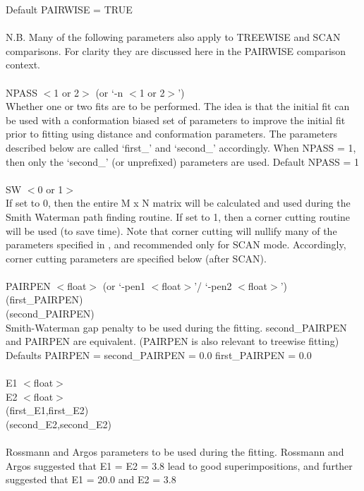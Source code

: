     Default PAIRWISE = TRUE\\
    \\
    N.B. Many of the following parameters also apply to TREEWISE and
    SCAN comparisons.  For clarity they are discussed here in the
    PAIRWISE comparison context.\\
    \\
    NPASS $<$1 or 2$>$ (or `-n  $<$1 or 2$>$')\\
    Whether one or two fits are to be performed.  The idea is that the 
    initial fit can be used with a conformation biased set of
    parameters to improve the initial fit prior to fitting using
    distance and conformation parameters.  The parameters described
    below are called `first\_' and `second\_' accordingly.  When NPASS =
    1, then only the `second\_' (or unprefixed) parameters are used.
    Default NPASS = 1\\
    \\
    SW $<$0 or 1$>$ \\
    If set to 0, then the entire M x N matrix will be calculated and
    used during the Smith Waterman path finding routine.  If set to 1,
    then a corner cutting routine will be used (to save time).  Note
    that corner cutting will nullify many of the parameters specified
    in \cite{rb92b}, and recommended only for SCAN mode. 
    Accordingly, corner cutting parameters are specified below (after
    SCAN).\\
    \\
    PAIRPEN $<$float$>$ (or `-pen1 $<$float$>$'/ `-pen2 $<$float$>$')\\
    (first\_PAIRPEN)\\
    (second\_PAIRPEN)\\
    Smith-Waterman gap penalty to be used during the fitting. 
    second\_PAIRPEN and PAIRPEN are equivalent. (PAIRPEN is also
    relevant to treewise fitting)\\
    Defaults PAIRPEN = second\_PAIRPEN = 0.0  first\_PAIRPEN = 0.0\\
    \\
    E1 $<$float$>$ \\
    E2 $<$float$>$\\
    (first\_E1,first\_E2)\\
    (second\_E2,second\_E2)\\
    \\
    Rossmann and Argos parameters to be used during the fitting.
    Rossmann and Argos suggested that E1 = E2 = 3.8 lead to good
    superimpositions, and further suggested that E1 = 20.0 and E2 = 3.8
